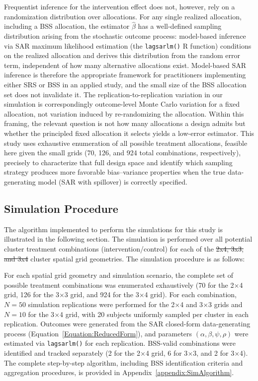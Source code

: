 \documentclass{article}[11pt]
\makeatletter
\providecommand{\DIFaddtex}[1]{{\protect\color{blue}\uwave{#1}}} %
\providecommand{\DIFdeltex}[1]{{\protect\color{red}\sout{#1}}} %
\providecommand{\DIFaddbegin}{} %
\providecommand{\DIFaddend}{} %
\providecommand{\DIFdelbegin}{} %
\providecommand{\DIFdelend}{} %
\providecommand{\DIFadd}[1]{\texorpdfstring{\DIFaddtex{#1}}{#1}} %
\providecommand{\DIFdel}[1]{\texorpdfstring{\DIFdeltex{#1}}{}} %
\providecommand{\DIFscaledelfig}{0.5}
\newlength{\DIFdelgraphicswidth} %
\newlength{\DIFdelgraphicsheight} %
\providecommand{\DIFaddincludegraphics}[2][]{{\color{blue}\fbox{\DIFOincludegraphics[#1]{#2}}}} %
\providecommand{\DIFdelincludegraphics}[2][]{%
\sbox{\DIFdelgraphicsbox}{\DIFOincludegraphics[#1]{#2}}%
\settoboxwidth{\DIFdelgraphicswidth}{\DIFdelgraphicsbox} %
\settoboxtotalheight{\DIFdelgraphicsheight}{\DIFdelgraphicsbox} %
\scalebox{\DIFscaledelfig}{%
\parbox[b]{\DIFdelgraphicswidth}{\usebox{\DIFdelgraphicsbox}\\[-\baselineskip] \rule{\DIFdelgraphicswidth}{0em}}\llap{\resizebox{\DIFdelgraphicswidth}{\DIFdelgraphicsheight}{%
\setlength{\unitlength}{\DIFdelgraphicswidth}%
\begin{picture}(1,1)%
\thicklines\linethickness{2pt} %
{\color[rgb]{1,0,0}\put(0,0){\framebox(1,1){}}}%
{\color[rgb]{1,0,0}\put(0,0){\line( 1,1){1}}}%
{\color[rgb]{1,0,0}\put(0,1){\line(1,-1){1}}}%
\end{picture}%
}\hspace*{3pt}}} %
} %
\DeclareRobustCommand{\DIFaddbegin}{\DIFOaddbegin \let\includegraphics\DIFaddincludegraphics} %
\DeclareRobustCommand{\DIFaddend}{\DIFOaddend \let\includegraphics\DIFOincludegraphics} %
\DeclareRobustCommand{\DIFdelbegin}{\DIFOdelbegin \let\includegraphics\DIFdelincludegraphics} %
\DeclareRobustCommand{\DIFdelend}{\DIFOaddend \let\includegraphics\DIFOincludegraphics} %
\let\sout@orig\sout %
\renewcommand{\sout}[1]{\ifmmode\text{\sout@orig{\ensuremath{#1}}}\else\sout@orig{#1}\fi} %
\makeatother
\begin{document}
Frequentist inference for the intervention effect does not, however, rely on a randomization distribution over allocations. For any single realized allocation, including a BSS allocation, the estimator $\hat{\beta}$ has a well-defined sampling distribution arising from the stochastic outcome process: model-based inference via SAR maximum likelihood estimation (the \texttt{lagsarlm()} R function) conditions on the realized allocation and derives this distribution from the random error term, independent of how many alternative allocations exist. Model-based SAR inference is therefore the appropriate framework for practitioners implementing either SRS or BSS in an applied study, and the small size of the BSS allocation set does not invalidate it. The replication-to-replication variation in our simulation is correspondingly outcome-level Monte Carlo variation for a fixed allocation, not variation induced by re-randomizing the allocation. Within this framing, the relevant question is not how many allocations a design admits but whether the principled fixed allocation it selects yields a low-error estimator. This study uses exhaustive enumeration of all possible treatment allocations, feasible here given the small grids (70, 126, and 924 total combinations, respectively), precisely to characterize that full design space and identify which sampling strategy produces more favorable bias--variance properties when the true data-generating model (SAR with spillover) is correctly specified.

\subsection{Simulation Procedure}\label{section:SimProcedure}

The algorithm implemented to perform the simulations for this study is illustrated in the following section. The simulation is performed over all potential cluster treatment combinations (intervention/control) for each of the \DIFdelbegin \DIFdel{2x4, 3x3, and 3x4 }\DIFdelend \DIFaddbegin \DIFadd{$2\times4$, $3\times3$, and $3\times4$ }\DIFaddend cluster spatial grid geometries. The simulation procedure is as follows:

For each spatial grid geometry and simulation scenario, the complete set of possible treatment combinations was enumerated exhaustively (70 for the 2$\times$4 grid, 126 for the 3$\times$3 grid, and 924 for the 3$\times$4 grid). For each combination, $N = 50$ simulation replications were performed for the 2$\times$4 and 3$\times$3 grids and $N = 10$ for the 3$\times$4 grid, with 20 subjects uniformly sampled per cluster in each replication. Outcomes were generated from the SAR closed-form data-generating process (Equation~\ref{Equation:ReducedForm}), and parameters $(\alpha, \beta, \psi, \rho)$ were estimated via \texttt{lagsarlm()} for each replication. BSS-valid combinations were identified and tracked separately (2 for the 2$\times$4 grid, 6 for 3$\times$3, and 2 for 3$\times$4). The complete step-by-step algorithm, including BSS identification criteria and aggregation procedures, is provided in Appendix~\ref{appendix:SimAlgorithm}.
\end{document}
